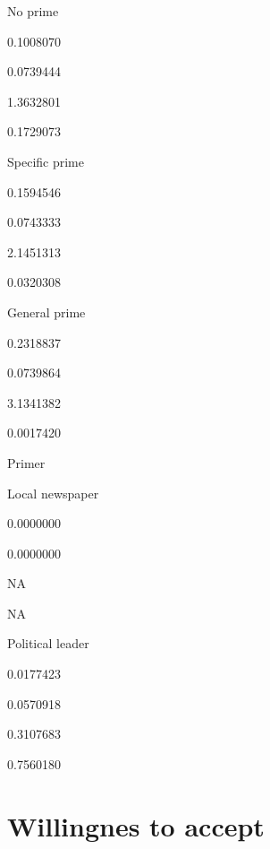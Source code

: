 \documentclass[]{book}
\begin{document}
No prime

0.1008070

0.0739444

1.3632801

0.1729073

Specific prime

0.1594546

0.0743333

2.1451313

0.0320308

General prime

0.2318837

0.0739864

3.1341382

0.0017420

Primer

Local newspaper

0.0000000

0.0000000

NA

NA

Political leader

0.0177423

0.0570918

0.3107683

0.7560180

\section{Willingnes to accept}\label{willingnes-to-accept-2}
\end{document}
